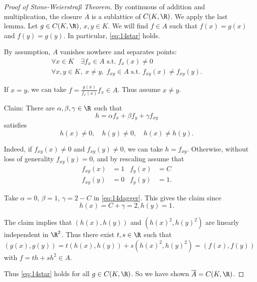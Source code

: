 \documentclass{article}
\begin{document}
\begin{proof}[Proof of Stone-Weierstra{\ss} Theorem]
    By continuous of addition and multiplication, the closure $\overline{A}$ is a sublattice of $C(K, \R)$.
    We apply the last lemma.
    Let $g \in C(K, \R)$, $x, y \in K$. We will find $f \in A$ such that $f(x) = g(x)$ and $f(y) = g(y)$.
    In particular, \eqref{eq:14star} holds.

    By assumption, $A$ vanishes nowhere and separates points:
    \begin{gather*}
        \forall x \in K \quad \exists f_x \in A \text{ s.t. } f_x(x) \neq 0 \\
        \forall x, y \in K, \; x \neq y, \; f_{xy} \in A \text{ s.t. } f_{xy}(x) \neq f_{xy}(y).
    \end{gather*}

    If $x = y$, we can take $f = \frac{g(x)}{f_x(x)} f_x \in A$.
    Thus assume $x \neq y$.

    Claim: There are $\alpha, \beta, \gamma \in \R$ such that
    \begin{equation*}
        h = \alpha f_x + \beta f_y + \gamma f_{xy} \label{eq:14dagger} \tag{$\dagger$}
    \end{equation*}
    satisfies
    \begin{equation*}
        h(x) \neq 0, \quad h(y) \neq 0, \quad h(x) \neq h(y).
    \end{equation*}

    Indeed, if $f_{xy}(x) \neq 0$ and $f_{xy}(y) \neq 0$, we can take $h = f_{xy}$.
    Otherwise, without loss of generality $f_{xy}(y) = 0$, and by rescaling assume that
    \begin{align*}
        f_{xy}(x) &= 1 & f_y(x) &= C \\
        f_{xy}(y) &= 0 & f_y(y) &= 1.
    \end{align*}

    Take $\alpha = 0$, $\beta=1$, $\gamma=2-C$ in \eqref{eq:14dagger}.
    This gives the claim since
    \begin{equation*}
        h(x) = C + \gamma = 2, h(y) = 1.
    \end{equation*}

    The claim implies that $(h(x), h(y))$ and $(h(x)^2, h(y)^2)$ are linearly independent in $\R^2$.
    Thus there exist $t, s \in \R$ such that
    \begin{equation*}
        (g(x), g(y)) = t(h(x), h(y)) + s(h(x)^2, h(y)^2) = (f(x), f(y))
    \end{equation*}
    with $f = th + sh^2 \in A$.

    Thus \eqref{eq:14star} holds for all $g \in C(K, \R)$.
    So we have shown $\overline{A} = C(K, \R)$.
\end{proof}
\end{document}
